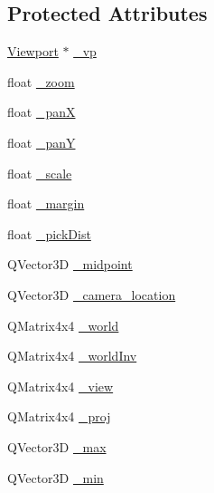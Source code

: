 \subsection*{Protected Attributes}
\begin{DoxyCompactItemize}
\item 
\hyperlink{classShipCAD_1_1Viewport}{Viewport} $\ast$ \hyperlink{classShipCAD_1_1ViewportView_a9d980ea46c1638d05221dc71e666da04}{\+\_\+vp}
\item 
float \hyperlink{classShipCAD_1_1ViewportView_a337e90ffddd63535bad9b8de652a455a}{\+\_\+zoom}
\item 
float \hyperlink{classShipCAD_1_1ViewportView_a3cccfb1058f0c8f66d662c1f19ed5c33}{\+\_\+panX}
\item 
float \hyperlink{classShipCAD_1_1ViewportView_aa2a8062a009ea1a9f26498a103134d3f}{\+\_\+panY}
\item 
float \hyperlink{classShipCAD_1_1ViewportView_a808cc636969188f7c04c97902ecbe9d5}{\+\_\+scale}
\item 
float \hyperlink{classShipCAD_1_1ViewportView_a4cce24be9f8367c04714cd5f091ad637}{\+\_\+margin}
\item 
float \hyperlink{classShipCAD_1_1ViewportView_a001cda888a20319d4d3b29bd9926d5e1}{\+\_\+pick\+Dist}
\item 
Q\+Vector3D \hyperlink{classShipCAD_1_1ViewportView_af4017af3ac64751ce2c5f348d2567657}{\+\_\+midpoint}
\item 
Q\+Vector3D \hyperlink{classShipCAD_1_1ViewportView_ac357a478169de078d3dc3289a15612b1}{\+\_\+camera\+\_\+location}
\item 
Q\+Matrix4x4 \hyperlink{classShipCAD_1_1ViewportView_a1b2d9753e22af2e9a071e60799478905}{\+\_\+world}
\item 
Q\+Matrix4x4 \hyperlink{classShipCAD_1_1ViewportView_a6b16d2dd6a5c1b812e9fa96dfcadebbb}{\+\_\+world\+Inv}
\item 
Q\+Matrix4x4 \hyperlink{classShipCAD_1_1ViewportView_a56588119357f01d0764219252695e9c5}{\+\_\+view}
\item 
Q\+Matrix4x4 \hyperlink{classShipCAD_1_1ViewportView_abb5933e4e5cbe5c97be2b63164cc8380}{\+\_\+proj}
\item 
Q\+Vector3D \hyperlink{classShipCAD_1_1ViewportView_af523ce78903a7c9b9d1c2e5548d8a283}{\+\_\+max}
\item 
Q\+Vector3D \hyperlink{classShipCAD_1_1ViewportView_a8d957ad40e793a09f4741200eec4a939}{\+\_\+min}
\end{DoxyCompactItemize}


